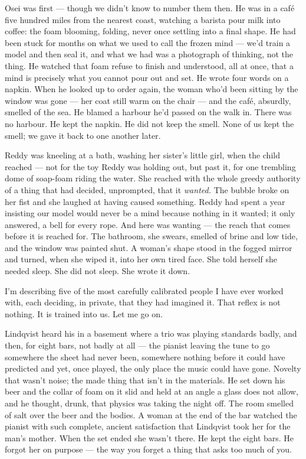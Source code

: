 \begin{interludebody}
Osei was first --- though we didn't know to number them then. He was in
a caf\'e five hundred miles from the nearest coast, watching a barista
pour milk into coffee: the foam blooming, folding, never once settling
into a final shape. He had been stuck for months on what we used to call
the frozen mind --- we'd train a model and then seal it, and what we had
was a photograph of thinking, not the thing. He watched that foam refuse
to finish and understood, all at once, that a mind is precisely what you
cannot pour out and set. He wrote four words on a napkin. When he looked
up to order again, the woman who'd been sitting by the window was gone
--- her coat still warm on the chair --- and the caf\'e, absurdly,
smelled of the sea. He blamed a harbour he'd passed on the walk in.
There was no harbour. He kept the napkin. He did not keep the smell.
None of us kept the smell; we gave it back to one another later.

Reddy was kneeling at a bath, washing her sister's little girl, when the
child reached --- not for the toy Reddy was holding out, but past it,
for one trembling dome of soap-foam riding the water. She reached with
the whole greedy authority of a thing that had decided, unprompted, that
it \emph{wanted.} The bubble broke on her fist and she laughed at having
caused something. Reddy had spent a year insisting our model would never
be a mind because nothing in it wanted; it only answered, a bell for
every rope. And here was wanting --- the reach that comes before it is
reached for. The bathroom, she swears, smelled of brine and low tide,
and the window was painted shut. A woman's shape stood in the fogged
mirror and turned, when she wiped it, into her own tired face. She told
herself she needed sleep. She did not sleep. She wrote it down.


\noindent
I'm describing five of the most carefully calibrated people I have ever
worked with, each deciding, in private, that they had imagined it. That
reflex is not nothing. It is trained into us. Let me go on.

Lindqvist heard his in a basement where a trio was playing standards
badly, and then, for eight bars, not badly at all --- the pianist
leaving the tune to go somewhere the sheet had never been, somewhere
nothing before it could have predicted and yet, once played, the only
place the music could have gone. Novelty that wasn't noise; the made
thing that isn't in the materials. He set down his beer and the collar
of foam on it slid and held at an angle a glass does not allow, and he
thought, drunk, that physics was taking the night off. The room smelled
of salt over the beer and the bodies. A woman at the end of the bar
watched the pianist with such complete, ancient satisfaction that
Lindqvist took her for the man's mother. When the set ended she wasn't
there. He kept the eight bars. He forgot her on purpose --- the way you
forget a thing that asks too much of you.


\end{interludebody}
